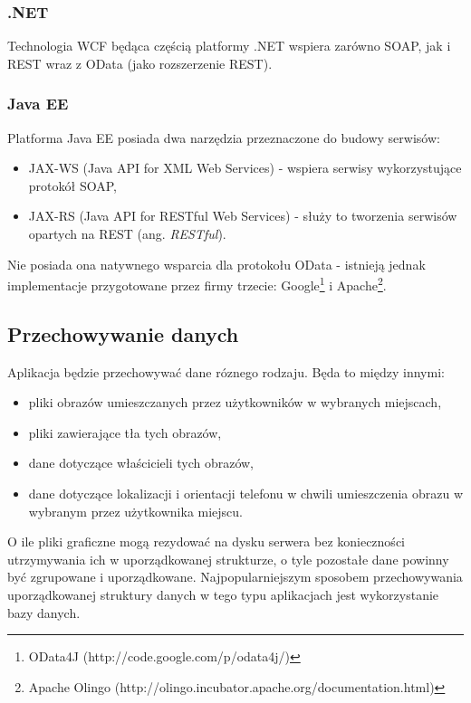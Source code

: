 \subsubsection{.NET}
Technologia WCF będąca częścią platformy .NET wspiera zarówno SOAP, jak i REST wraz z OData (jako rozszerzenie REST).

\subsubsection{Java EE}
Platforma Java EE posiada dwa narzędzia przeznaczone do budowy serwisów:
\begin{itemize}
 \item JAX-WS (Java API for XML Web Services) - wspiera serwisy wykorzystujące protokół SOAP,
 \item JAX-RS (Java API for RESTful Web Services) - służy to tworzenia serwisów opartych na REST (ang. \emph{RESTful}).
\end{itemize}

Nie posiada ona natywnego wsparcia dla protokołu OData - istnieją jednak implementacje przygotowane przez firmy trzecie: Google\footnote{OData4J (http://code.google.com/p/odata4j/)} i Apache\footnote{Apache Olingo (http://olingo.incubator.apache.org/documentation.html)}.

\subsection{Przechowywanie danych}
Aplikacja będzie przechowywać dane róznego rodzaju.
Będa to między innymi:
\begin{itemize}
 \item pliki obrazów umieszczanych przez użytkowników w wybranych miejscach,
 \item pliki zawierające tła tych obrazów,
 \item dane dotyczące właścicieli tych obrazów,
 \item dane dotyczące lokalizacji i orientacji telefonu w chwili umieszczenia obrazu w wybranym przez użytkownika miejscu.
\end{itemize}

O ile pliki graficzne mogą rezydować na dysku serwera bez konieczności utrzymywania ich w uporządkowanej strukturze, o tyle pozostałe dane powinny być zgrupowane i uporządkowane.
Najpopularniejszym sposobem przechowywania uporządkowanej struktury danych w tego typu aplikacjach jest wykorzystanie bazy danych.